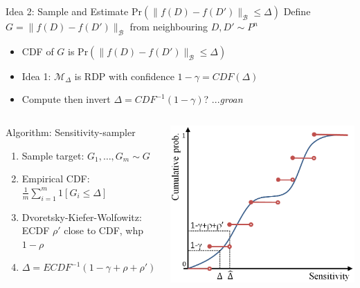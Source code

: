 \documentclass{beamer}
\newcommand{\cB}{\ensuremath{\mathcal{B}}\xspace}
\newcommand{\mech}{\ensuremath{\mathcal{M}}\xspace}
\renewcommand{\Pr}[1]{\ensuremath{\mathrm{Pr}\left(#1\right)}}
\begin{document}
\begin{frame}{Idea 2: Sample and Estimate $\Pr{\|f(D)-f(D')\|_\cB\leq\Delta}$}
Define $G=\|f(D)-f(D')\|_\cB$ from neighbouring $D,D'\sim P^n$
\begin{itemize}
\item \alert{CDF of $G$} is $\Pr{\|f(D)-f(D')\|_\cB\leq\Delta}$
\item Idea 1: $\mech_\Delta$ is RDP with confidence $1-\gamma=CDF(\Delta)$
\item \alert{Compute then invert} $\Delta=CDF^{-1}(1-\gamma)$? ...\emph{groan}
\end{itemize}
\vspace{-0.5em}
\pause
\begin{columns}[T,onlytextwidth]
\begin{block}{Algorithm: \alert{Sensitivity-sampler}}
\begin{enumerate}
	\item Sample target: $G_1,\ldots,G_m\sim G$
	\item Empirical CDF: $\frac{1}{m}\sum_{i=1}^m 1[G_i\leq\Delta]$
	\item Dvoretsky-Kiefer-Wolfowitz: \\ ECDF $\rho'$ close to CDF, whp $1-\rho$
	\item $\Delta=ECDF^{-1}(1-\gamma+\rho+\rho')$
\end{enumerate}
\end{block}
\vspace{1.5em}
\hfill\includegraphics[width=0.98\columnwidth]{figures/samplerhowto}
\end{columns}
\end{frame}
\end{document}
